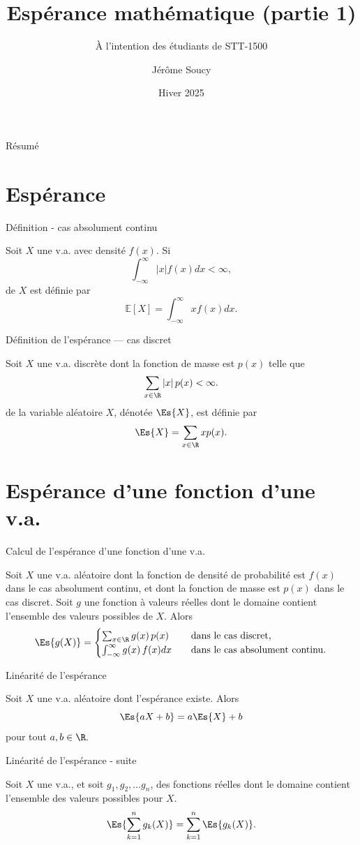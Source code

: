 \documentclass[nuit,charter,pied]{BeamerJS}
\title{Espérance mathématique (partie 1)}
\subtitle{À l'intention des étudiants de STT-1500}
\institute{Université Laval}
\author{Jérôme Soucy}
\date{Hiver 2025}
\begin{document}
\begin{frame}
	\titlepage
\end{frame}

\begin{frame}{Résumé}
\tableofcontents
\end{frame}
\section{Espérance}
\begin{frame}{Définition - cas absolument continu}
	\pause
	\begin{defn}{}
		Soit $X$ une v.a. avec densité $f(x)$. Si
		\[\int_{-\infty}^{\infty}|x|f(x)dx<\infty,\]
		 de $X$ est définie par
		\[\mathbb{E}[X]=\int_{-\infty}^{\infty}xf(x)dx.\]
	\end{defn}\pause
\end{frame}
\begin{frame}{Définition de l'espérance --- cas discret}
	\pause
	\begin{defn}{}
		Soit $X$ une v.a. discrète dont la fonction de masse est $p(x)$ telle que
		\[\sum_{x\in\R}|x|\,p(x)<\infty.\]
		 de la variable aléatoire $X$, dénotée $\Es{X}$, est définie par
		\[\Es{X}=\sum_{x\in\R}xp(x).\]
	\end{defn}
\end{frame}

\section[Esp. d'une fonct. d'une v.a.]{Espérance d'une fonction d'une v.a.}
\begin{frame}{Calcul de l'espérance d'une fonction d'une v.a.}
	\pause
	\begin{thm}
		Soit $X$ une v.a. aléatoire dont la fonction de densité de probabilité est $f(x)$ dans le cas absolument continu, et dont la fonction de masse est $p(x)$ dans le cas discret. Soit $g$ une fonction à valeurs réelles dont le domaine contient l'ensemble des valeurs possibles de $X$. Alors
		\[\Es{g(X)}=\begin{cases}
			\sum_{x\in\R}g(x)\,p(x)&\quad \text{dans le cas discret,}\\
			\int_{-\infty}^{\infty}g(x)\,f(x)dx&\quad \text{dans le cas absolument continu.}\end{cases}\]
	\end{thm}
\end{frame}
\begin{frame}{Linéarité de l'espérance}
	\pause
	\begin{thm}
		Soit $X$ une v.a. aléatoire dont l'espérance existe. Alors
		\[\Es{aX+b}=a\Es{X}+b\]
		pour tout $a,b\in\R.$
	\end{thm}
\end{frame}
\begin{frame}{Linéarité de l'espérance - suite}
	\pause
	\begin{thm}
		Soit $X$ une v.a., et soit $g_1,g_2,\ldots g_n$, des fonctions réelles dont le domaine contient l'ensemble des valeurs possibles pour $X$.
		\[\Es{\sum_{k=1}^n g_k(X)}=\sum_{k=1}^n\Es{g_k(X)}.\]
	\end{thm}
\end{frame}
\end{document}
